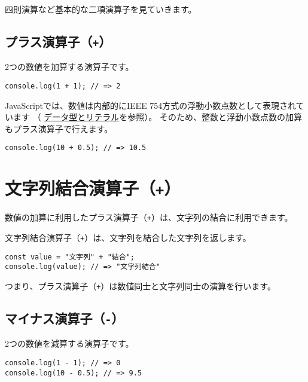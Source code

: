 四則演算など基本的な二項演算子を見ていきます。

\hypertarget{plus-operator}{%
\subsection{\texorpdfstring{プラス演算子（\texttt{+}）}{プラス演算子（+）}}\label{plus-operator}}

2つの数値を加算する演算子です。

\begin{lstlisting}
console.log(1 + 1); // => 2
\end{lstlisting}

JavaScriptでは、数値は内部的にIEEE
754方式の浮動小数点数として表現されています （
\href{../data-type/README.md}{データ型とリテラル}を参照）。
そのため、整数と浮動小数点数の加算もプラス演算子で行えます。

\begin{lstlisting}
console.log(10 + 0.5); // => 10.5
\end{lstlisting}

\hypertarget{string-combination-operator}{%
\section{\texorpdfstring{文字列結合演算子（\texttt{+}）}{文字列結合演算子（+）}}\label{string-combination-operator}}

数値の加算に利用したプラス演算子（\texttt{+}）は、文字列の結合に利用できます。

文字列結合演算子（\texttt{+}）は、文字列を結合した文字列を返します。

\begin{lstlisting}
const value = "文字列" + "結合";
console.log(value); // => "文字列結合"
\end{lstlisting}

つまり、プラス演算子（\texttt{+}）は数値同士と文字列同士の演算を行います。

\hypertarget{minus-operator}{%
\subsection{\texorpdfstring{マイナス演算子（\texttt{-}）}{マイナス演算子（-）}}\label{minus-operator}}

2つの数値を減算する演算子です。

\begin{lstlisting}
console.log(1 - 1); // => 0
console.log(10 - 0.5); // => 9.5
\end{lstlisting}

